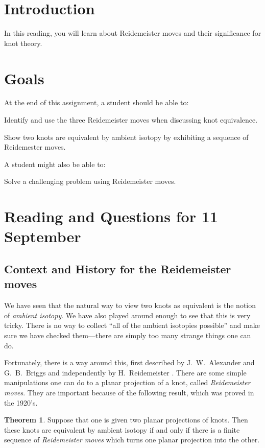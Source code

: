 \documentclass[12pt,letterpaper]{article}
\theoremstyle{definition}
\newtheorem*{theorem}{Theorem}
\begin{document}
\setlength{\parskip}{1ex plus 0.5ex minus 0.2ex}
\setlength{\parindent}{0pt}

\pagestyle{fancy}
\cfoot{}

\section*{Introduction}
In this reading, you will learn about Reidemeister moves and their significance for knot theory.

\section*{Goals}
At the end of this assignment, a student should be able to:
\begin{compactitem}
\item Identify and use the three Reidemeister moves when discussing knot equivalence.
\item Show two knots are equivalent by ambient isotopy by exhibiting a sequence of Reidemester moves.
\end{compactitem}
A student might also be able to:
\begin{compactitem}
\item Solve a challenging problem using Reidemeister moves.
\end{compactitem}

\section*{Reading and Questions for 11 September}

\subsection*{Context and History for the Reidemeister moves}
We have seen that the natural way to view two knots as equivalent is the notion of \emph{ambient isotopy}.
We have also played around enough to see that this is very tricky.
There is no way to collect ``all of the ambient isotopies possible'' and make sure we have checked them---there are simply too many strange things one can do.

Fortunately, there is a way around this, first described by J.~W.~Alexander and G.~B.~Briggs \cite{AB} and independently by H.~Reidemeister \cite{R}.
There are some simple manipulations one can do to a planar projection of a knot, called \emph{Reidemeister moves}.
They are important because of the following result, which was proved in the 1920's.
\begin{theorem}
Suppose that one is given two planar projections of knots.
Then these knots are equivalent by ambient isotopy if and only if there is a finite sequence of \emph{Reidemeister moves} which turns one planar projection into the other.
\end{theorem}
\end{document}
